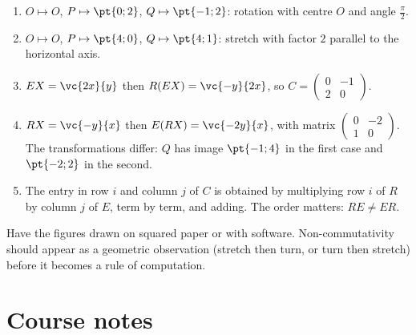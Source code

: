 \begin{solution}[Activity]
\begin{enumerate}
\item $O\mapsto O$, $P\mapsto\pt{0;2}$, $Q\mapsto\pt{-1;2}$: rotation with centre $O$ and angle $\frac\pi2$.
\item $O\mapsto O$, $P\mapsto\pt{4;0}$, $Q\mapsto\pt{4;1}$: stretch with factor $2$ parallel to the horizontal axis.
\item $EX=\vc{2x}{y}$ then $R(EX)=\vc{-y}{2x}$, so $C=\begin{pmatrix}0&-1\\2&0\end{pmatrix}$.
\item $RX=\vc{-y}{x}$ then $E(RX)=\vc{-2y}{x}$, with matrix $\begin{pmatrix}0&-2\\1&0\end{pmatrix}$. The transformations differ: $Q$ has image $\pt{-1;4}$ in the first case and $\pt{-2;2}$ in the second.
\item The entry in row $i$ and column $j$ of $C$ is obtained by multiplying row $i$ of $R$ by column $j$ of $E$, term by term, and adding. The order matters: $RE\neq ER$.
\end{enumerate}
\end{solution}
\begin{teachernote}
Have the figures drawn on squared paper or with software. Non-commutativity should appear as a geometric observation (stretch then turn, or turn then stretch) before it becomes a rule of computation.
\end{teachernote}

\mxnewpage
\section{Course notes}
